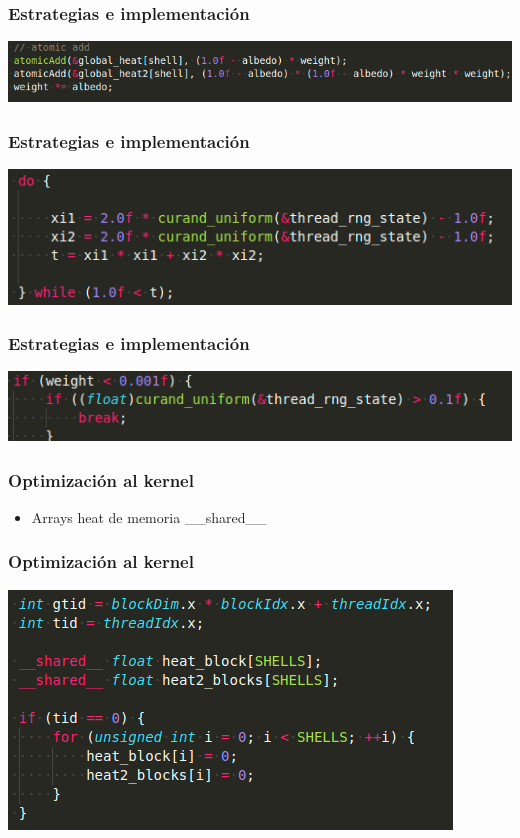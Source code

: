 \documentclass{beamer}
\begin{document}
\begin{frame}
    \frametitle{Estrategias e implementación}
    \includegraphics[width=\textwidth]{imagenes/code4.png}

\end{frame}

\begin{frame}
    \frametitle{Estrategias e implementación}
    \includegraphics[width=\textwidth]{imagenes/code5.png}

\end{frame}

\begin{frame}
    \frametitle{Estrategias e implementación}
    \includegraphics[width=\textwidth]{imagenes/code6.png}

\end{frame}

\begin{frame}
    \frametitle{Optimización al kernel}
    \begin{itemize}
        \item Arrays heat de memoria \_\_shared\_\_ 
    \end{itemize}
\end{frame}

\begin{frame}
    \frametitle{Optimización al kernel}
    \includegraphics[width=\textwidth]{imagenes/code7.png}
\end{frame}
\end{document}

